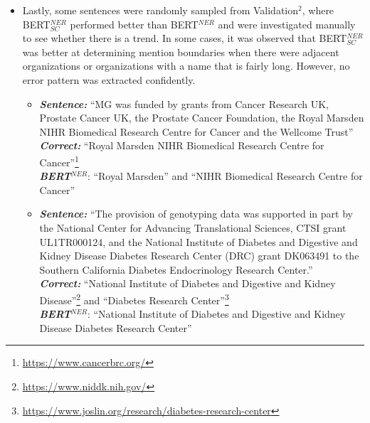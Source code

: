 \documentclass{report}
\theoremstyle{definition}
\theoremstyle{remark}
\begin{document}
\begin{itemize}
    \item Lastly, some sentences were randomly sampled from Validation$^2$, where BERT$^{NER}_{SC}$ performed better than BERT$^{NER}$ and were investigated manually to see whether there is a trend. In some cases, it was observed that BERT$^{NER}_{SC}$ was better at determining mention boundaries when there were adjacent organizations or organizations with a name that is fairly long. However, no error pattern was extracted confidently. \\ 
    \begin{itemize}
        \item \textbf{\textit{Sentence:}} ``MG was funded by grants from Cancer Research UK, Prostate Cancer UK, the Prostate Cancer Foundation, the Royal Marsden NIHR Biomedical Research Centre for Cancer and the Wellcome Trust''\\
        \textbf{\textit{Correct:}} ``Royal Marsden NIHR Biomedical Research Centre for Cancer''\footnote{\url{https://www.cancerbrc.org/}}\\
        \textbf{\textit{BERT}}$^{NER}$: ``Royal Marsden'' and ``NIHR Biomedical Research Centre for Cancer''
        \item \textbf{\textit{Sentence:}} ``The provision of genotyping data was supported in part by the National Center for Advancing Translational Sciences, CTSI grant UL1TR000124, and the National Institute of Diabetes and Digestive and Kidney Disease Diabetes Research Center (DRC) grant DK063491 to the Southern California Diabetes Endocrinology Research Center.'' \\
         \newline
        \textbf{\textit{Correct:}} ``National Institute of Diabetes and Digestive and Kidney Disease''\footnote{\url{https://www.niddk.nih.gov/}} and ``Diabetes Research Center''\footnote{\url{https://www.joslin.org/research/diabetes-research-center}} \\
        \textbf{\textit{BERT}}$^{NER}$: ``National Institute of Diabetes and Digestive and Kidney Disease Diabetes Research Center''\\
    \end{itemize}
\end{itemize}
\end{document}
